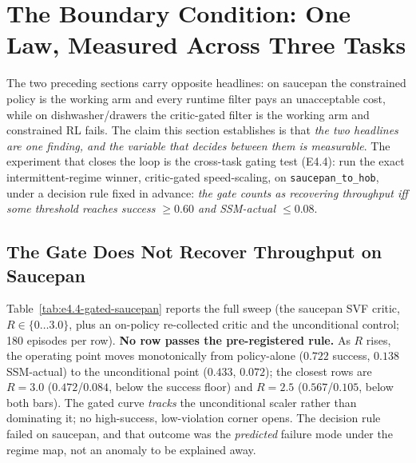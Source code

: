 \documentclass[11pt,a4paper]{report}
\newcommand{\ssm}{SSM}
\begin{document}
\section{The Boundary Condition: One Law, Measured Across Three Tasks}
\label{sec:results:boundary}

The two preceding sections carry opposite headlines: on saucepan the
constrained policy is the working arm and every runtime filter pays
an unacceptable cost, while on dishwasher/drawers the critic-gated
filter is the working arm and constrained RL fails. The claim this
section establishes is that \emph{the two headlines are one finding,
and the variable that decides between them is measurable}. The
experiment that closes the loop is the cross-task gating test
(E4.4): run the exact intermittent-regime winner, critic-gated
speed-scaling, on \texttt{saucepan\_to\_hob}, under a decision rule
fixed in advance: \emph{the gate counts as recovering throughput iff
some threshold reaches success $\geq 0.60$ and \ssm{}-actual
$\leq 0.08$}.

\subsection{The Gate Does Not Recover Throughput on Saucepan}

Table~\ref{tab:e4.4-gated-saucepan} reports the full sweep (the
saucepan SVF critic, $R \in \{0 \ldots 3.0\}$, plus an on-policy
re-collected critic and the unconditional control; 180 episodes per
row). \textbf{No row passes the pre-registered rule.} As $R$ rises,
the operating point moves monotonically from policy-alone
($0.722$ success, $0.138$ \ssm{}-actual) to the unconditional point
($0.433$, $0.072$); the closest rows are $R = 3.0$ ($0.472$/$0.084$,
below the success floor) and $R = 2.5$ ($0.567$/$0.105$, below both
bars). The gated curve \emph{tracks} the unconditional scaler rather
than dominating it; no high-success, low-violation corner opens.
The decision rule failed on saucepan, and that outcome was the
\emph{predicted} failure mode under the regime map, not an anomaly to
be explained away.
\end{document}
